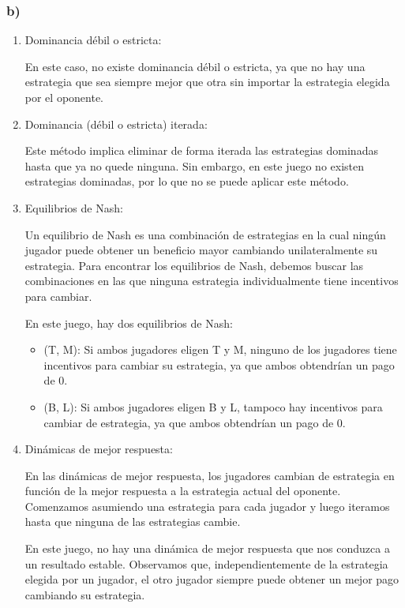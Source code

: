 \documentclass[11pt]{article}
\begin{document}
\subsubsection*{b)}
\begin{enumerate}
    \item Dominancia débil o estricta:
    
    En este caso, no existe dominancia débil o estricta, ya que no hay una estrategia que sea siempre mejor que otra sin importar la estrategia elegida por el oponente.
    
    \item Dominancia (débil o estricta) iterada:
    
    Este método implica eliminar de forma iterada las estrategias dominadas hasta que ya no quede ninguna. Sin embargo, en este juego no existen estrategias dominadas, por lo que no se puede aplicar este método.
    
    \item Equilibrios de Nash:
    
    Un equilibrio de Nash es una combinación de estrategias en la cual ningún jugador puede obtener un beneficio mayor cambiando unilateralmente su estrategia. Para encontrar los equilibrios de Nash, debemos buscar las combinaciones en las que ninguna estrategia individualmente tiene incentivos para cambiar.
    
    En este juego, hay dos equilibrios de Nash:
    \begin{itemize}
    \item (T, M): Si ambos jugadores eligen T y M, ninguno de los jugadores tiene incentivos para cambiar su estrategia, ya que ambos obtendrían un pago de 0.
    \item (B, L): Si ambos jugadores eligen B y L, tampoco hay incentivos para cambiar de estrategia, ya que ambos obtendrían un pago de 0.
    \end{itemize}
    
    \item Dinámicas de mejor respuesta:
    
    En las dinámicas de mejor respuesta, los jugadores cambian de estrategia en función de la mejor respuesta a la estrategia actual del oponente. Comenzamos asumiendo una estrategia para cada jugador y luego iteramos hasta que ninguna de las estrategias cambie.
    
    En este juego, no hay una dinámica de mejor respuesta que nos conduzca a un resultado estable. Observamos que, independientemente de la estrategia elegida por un jugador, el otro jugador siempre puede obtener un mejor pago cambiando su estrategia.
    

\end{enumerate}
\end{document}
